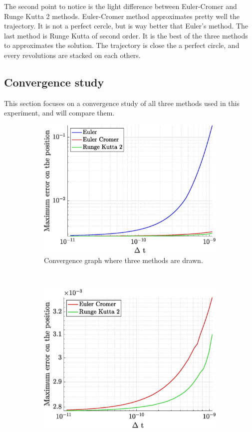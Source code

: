 \documentclass[a4paper,12pt,twoside]{article}
\begin{document}
The second point to notice is the light difference between Euler-Cromer and Runge Kutta 2 methods.
Euler-Cromer method approximates pretty well the trajectory.
It is not a perfect cercle, but is way better that Euler's method.
The last method is Runge Kutta of second order.
It is the best of the three methods to approximates the solution.
The trajectory is close the a perfect circle, and every revolutions are stacked on each others.

\subsection{Convergence study}
This section focuses on a convergence study of all three methods used in this experiment, and will compare them.
\begin{figure}[h]
\centering
\begin{subfigure}[t]{0.45\textwidth}
	\includegraphics[width=\textwidth]{graphs/app1_conv_ALL.eps}
	\caption{Convergence graph where three methods are drawn.}
	\label{fig:app1-conv-ALL}
\end{subfigure}
~
\begin{subfigure}[t]{0.45\textwidth}
	\includegraphics[width=\textwidth]{graphs/app1_conv_noEuler.eps}

\end{subfigure}
\end{figure}
\end{document}
